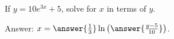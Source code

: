 \documentclass{ximera}
\author{Ivo Terek}
\begin{document}
\begin{exercise}

  If $y = 10e^{3x}+5$, solve for $x$ in terms of $y$.

  Answer: $x = \answer{\frac{1}{3}} \ln \left(\answer{\frac{y-5}{10}}\right)$.

\end{exercise}
\end{document}
